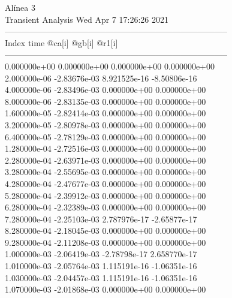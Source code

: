                                    Alínea 3 \\ \hline
                                   Transient Analysis  Wed Apr  7 17:26:26  2021\\ \hline
--------------------------------------------------------------------------------\\ \hline
Index   time            @ca[i]          @gb[i]          @r1[i]          \\ \hline
--------------------------------------------------------------------------------\\ 	0.000000e+00	0.000000e+00	0.000000e+00	0.000000e+00	\\ 	2.000000e-06	-2.83676e-03	8.921525e-16	-8.50806e-16	\\ 	4.000000e-06	-2.83496e-03	0.000000e+00	0.000000e+00	\\ 	8.000000e-06	-2.83135e-03	0.000000e+00	0.000000e+00	\\ 	1.600000e-05	-2.82414e-03	0.000000e+00	0.000000e+00	\\ 	3.200000e-05	-2.80978e-03	0.000000e+00	0.000000e+00	\\ 	6.400000e-05	-2.78129e-03	0.000000e+00	0.000000e+00	\\ 	1.280000e-04	-2.72516e-03	0.000000e+00	0.000000e+00	\\ 	2.280000e-04	-2.63971e-03	0.000000e+00	0.000000e+00	\\ 	3.280000e-04	-2.55695e-03	0.000000e+00	0.000000e+00	\\ 	4.280000e-04	-2.47677e-03	0.000000e+00	0.000000e+00	\\ 	5.280000e-04	-2.39912e-03	0.000000e+00	0.000000e+00	\\ 	6.280000e-04	-2.32389e-03	0.000000e+00	0.000000e+00	\\ 	7.280000e-04	-2.25103e-03	2.787976e-17	-2.65877e-17	\\ 	8.280000e-04	-2.18045e-03	0.000000e+00	0.000000e+00	\\ 	9.280000e-04	-2.11208e-03	0.000000e+00	0.000000e+00	\\ 	1.000000e-03	-2.06419e-03	-2.78798e-17	2.658770e-17	\\ 	1.010000e-03	-2.05764e-03	1.115191e-16	-1.06351e-16	\\ 	1.030000e-03	-2.04457e-03	1.115191e-16	-1.06351e-16	\\ 	1.070000e-03	-2.01868e-03	0.000000e+00	0.000000e+00	\\ \hline
